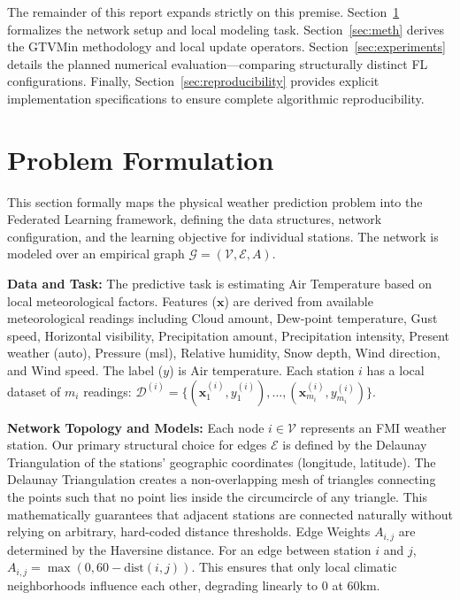 \documentclass{article}
\begin{document}
The remainder of this report expands strictly on this premise. Section~\ref{sec:pf} formalizes the network setup and local modeling task. Section~\ref{sec:meth} derives the GTVMin methodology and local update operators. Section~\ref{sec:experiments} details the planned numerical evaluation—comparing structurally distinct FL configurations. Finally, Section~\ref{sec:reproducibility} provides explicit implementation specifications to ensure complete algorithmic reproducibility.

\section{Problem Formulation}
\label{sec:pf}

This section formally maps the physical weather prediction problem into the Federated Learning framework, defining the data structures, network configuration, and the learning objective for individual stations. The network is modeled over an empirical graph $\mathcal{G} = (\mathcal{V}, \mathcal{E}, A)$.

\textbf{Data and Task:} The predictive task is estimating Air Temperature based on local meteorological factors. Features ($\mathbf{x}$) are derived from available meteorological readings including Cloud amount, Dew-point temperature, Gust speed, Horizontal visibility, Precipitation amount, Precipitation intensity, Present weather (auto), Pressure (msl), Relative humidity, Snow depth, Wind direction, and Wind speed. The label ($y$) is Air temperature. Each station $i$ has a local dataset of $m_i$ readings: $\mathcal{D}^{(i)} = \{(\mathbf{x}^{(i)}_1, y^{(i)}_1), \dots, (\mathbf{x}^{(i)}_{m_i}, y^{(i)}_{m_i})\}$.

\textbf{Network Topology and Models:} Each node $i \in \mathcal{V}$ represents an FMI weather station. Our primary structural choice for edges $\mathcal{E}$ is defined by the Delaunay Triangulation of the stations' geographic coordinates (longitude, latitude). The Delaunay Triangulation creates a non-overlapping mesh of triangles connecting the points such that no point lies inside the circumcircle of any triangle. This mathematically guarantees that adjacent stations are connected naturally without relying on arbitrary, hard-coded distance thresholds. Edge Weights $A_{i,j}$ are determined by the Haversine distance. For an edge between station $i$ and $j$, $A_{i,j} = \max(0, 60 - \text{dist}(i,j))$. This ensures that only local climatic neighborhoods influence each other, degrading linearly to 0 at 60km. 
\end{document}
